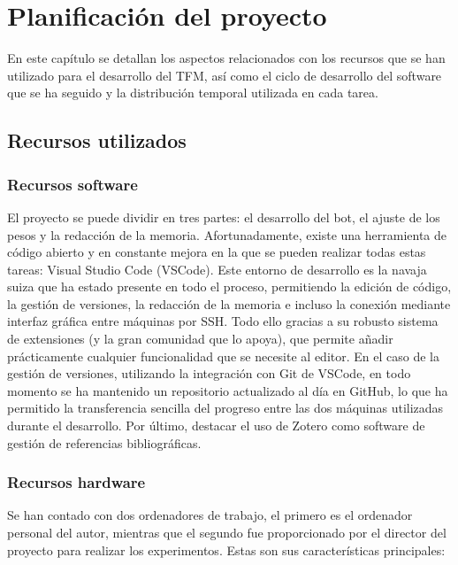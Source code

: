 \chapter{Planificación del proyecto} \label{chap:planificacion}

En este capítulo se detallan los aspectos relacionados con los recursos que se han utilizado para el desarrollo del TFM, así como el ciclo de desarrollo del software que se ha seguido y la distribución temporal utilizada en cada tarea.

\section{Recursos utilizados} \label{sec:recursos_utilizados}

\subsection{Recursos software} \label{sec:recursos_software}

El proyecto se puede dividir en tres partes: el desarrollo del bot, el ajuste de los pesos y la redacción de la memoria. Afortunadamente, existe una herramienta de código abierto y en constante mejora en la que se pueden realizar todas estas tareas: Visual Studio Code (VSCode). Este entorno de desarrollo es la navaja suiza que ha estado presente en todo el proceso, permitiendo la edición de código, la gestión de versiones, la redacción de la memoria e incluso la conexión mediante interfaz gráfica entre máquinas por SSH. Todo ello gracias a su robusto sistema de extensiones (y la gran comunidad que lo apoya), que permite añadir prácticamente cualquier funcionalidad que se necesite al editor. En el caso de la gestión de versiones, utilizando la integración con Git de VSCode, en todo momento se ha mantenido un repositorio actualizado al día en GitHub, lo que ha permitido la transferencia sencilla del progreso entre las dos máquinas utilizadas durante el desarrollo. Por último, destacar el uso de Zotero como software de gestión de referencias bibliográficas.

\subsection{Recursos hardware} \label{sec:recursos_hardware}

Se han contado con dos ordenadores de trabajo, el primero es el ordenador personal del autor, mientras que el segundo fue proporcionado por el director del proyecto para realizar los experimentos. Estas son sus características principales:

